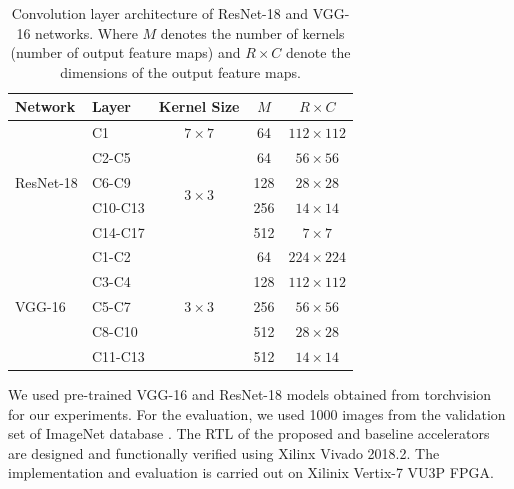 \documentclass[conference]{IEEEtran}
\begin{document}
\renewcommand{\arraystretch}{1.4}
\begin{table}[]
    \centering
    \caption{Convolution layer architecture of ResNet-18 and VGG-16 networks. Where \(M\) denotes the number of kernels (number of output feature maps) and \(R\times C\) denote the dimensions of the output feature maps.}
    \begin{tabular}{l l c c c} \hline
        \textbf{Network} & \textbf{Layer} & \textbf{Kernel Size} & \(M\)  & \(R \times C\) \\ \hline \hline
        \multirow{5}{*}{ResNet-18} & C1 & \(7\times 7\) & 64 & \(112 \times 112\) \\
        & C2-C5 & \multirow{4}{*}{\(3 \times 3\)} & 64 & \(56 \times 56\) \\
        & C6-C9 & & 128 & \(28 \times 28\) \\
        & C10-C13 & & 256 & \(14 \times 14\) \\
        & C14-C17 & & 512 & \(7 \times 7\) \\ \hline \hline
        \multirow{5}{*}{VGG-16} & C1-C2 & \multirow{5}{*}{\(3 \times 3\)} & 64  & \(224 \times 224\) \\
        & C3-C4 & & 128  & \(112 \times 112\) \\
        & C5-C7 & & 256  & \(56 \times 56\) \\
        & C8-C10 & & 512  & \(28 \times 28\) \\
        & C11-C13 & & 512  & \(14 \times 14\) \\ \hline
    \end{tabular}
    
    \label{tab:CNNs}
\end{table}

We used pre-trained VGG-16 and ResNet-18 models obtained from torchvision \cite{marcel2010torchvision} for our experiments. For the evaluation, we used 1000 images from the validation set of ImageNet database \cite{deng2009imagenet}. The RTL of the proposed and baseline accelerators are designed and functionally verified using Xilinx Vivado 2018.2. The implementation and evaluation is carried out on Xilinix Vertix-7 VU3P FPGA.
\end{document}
